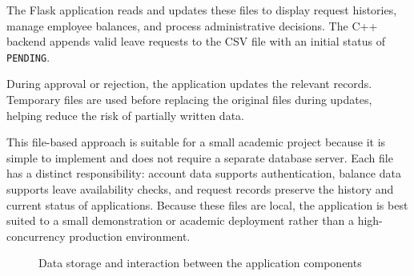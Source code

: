 \documentclass[12pt,a4paper,oneside]{book}
\begin{document}
The Flask application reads and updates these files to display request histories, manage employee balances, and process administrative decisions. The C++ backend appends valid leave requests to the CSV file with an initial status of \texttt{PENDING}.



During approval or rejection, the application updates the relevant records. Temporary files are used before replacing the original files during updates, helping reduce the risk of partially written data.



This file-based approach is suitable for a small academic project because it is simple to implement and does not require a separate database server. Each file has a distinct responsibility: account data supports authentication, balance data supports leave availability checks, and request records preserve the history and current status of applications. Because these files are local, the application is best suited to a small demonstration or academic deployment rather than a high-concurrency production environment.



\begin{figure}[htbp]

\centering


\caption{Data storage and interaction between the application components}

\label{fig:data-storage}

\end{figure}
\end{document}
